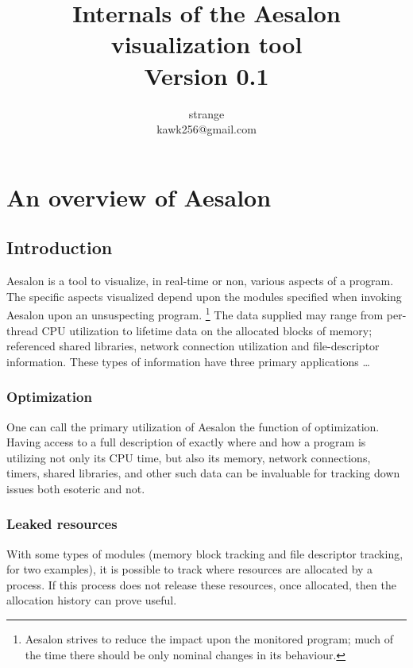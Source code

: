 \documentclass[a4paper,10pt]{report}
\author{strange\\kawk256@gmail.com}
\title{Internals of the Aesalon visualization tool\\\normalsize{Version 0.1}}
\begin{document}
\setlength{\parindent}{0pt}
\setlength{\parskip}{1ex plus 0.5ex minus 0.2ex}


\maketitle

\tableofcontents

\chapter[Overview]{An overview of Aesalon}
\section{Introduction}
Aesalon is a tool to visualize, in real-time or non, various aspects of a program.
The specific aspects visualized depend upon the modules specified when invoking Aesalon
upon an unsuspecting program. \footnote{Aesalon strives to reduce the impact upon the
monitored program; much of the time there should be only nominal changes in its behaviour.}
The data supplied may range from per-thread CPU utilization to lifetime data on the allocated
blocks of memory; referenced shared libraries, network connection utilization and file-descriptor
information. These types of information have three primary applications \ldots

\subsection{Optimization}
One can call the primary utilization of Aesalon the function of optimization. Having access to a
full description of exactly where and how a program is utilizing not only its CPU time, but also
its memory, network connections, timers, shared libraries, and other such data can be invaluable
for tracking down issues both esoteric and not.

\subsection{Leaked resources}
With some types of modules (memory block tracking and file descriptor tracking, for two examples),
it is possible to track where resources are allocated by a process. If this process does not release
these resources, once allocated, then the allocation history can prove useful.
\end{document}

